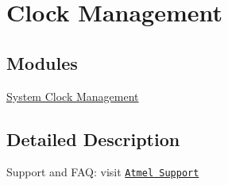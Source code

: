 \hypertarget{group__clk__group}{\section{Clock Management}
\label{group__clk__group}
}
\subsection*{Modules}
\begin{DoxyCompactItemize}
\item 
\hyperlink{group__sysclk__group}{System Clock Management}
\end{DoxyCompactItemize}


\subsection{Detailed Description}
Support and F\-A\-Q\-: visit \href{http://www.atmel.com/design-support/}{\tt Atmel Support} 